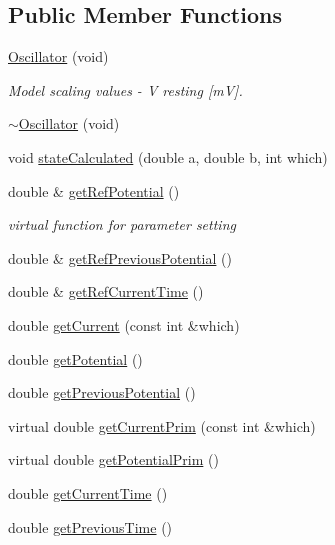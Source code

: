\subsection*{Public Member Functions}
\begin{DoxyCompactItemize}
\item 
\hyperlink{class_oscillator_aad43fa7eeffdeb0cbc4767f2de538d80}{Oscillator} (void)
\begin{DoxyCompactList}\small\item\em Model scaling values -\/ V resting \mbox{[}m\+V\mbox{]}. \end{DoxyCompactList}\item 
\hyperlink{class_oscillator_accb2f4ecc6604b2c38a7fd9973578360}{$\sim$\+Oscillator} (void)
\item 
void \hyperlink{class_oscillator_abc5d43aeb061d97dd58749baf2b8f82d}{state\+Calculated} (double a, double b, int which)
\item 
double \& \hyperlink{class_oscillator_a6d6d8ef3c022f6fd8c31c3e50987a822}{get\+Ref\+Potential} ()
\begin{DoxyCompactList}\small\item\em virtual function for parameter setting \end{DoxyCompactList}\item 
double \& \hyperlink{class_oscillator_a734d7375586e9982a6419d1f08b63c57}{get\+Ref\+Previous\+Potential} ()
\item 
double \& \hyperlink{class_oscillator_ac82b2732257e64c0f84f5b520ef16704}{get\+Ref\+Current\+Time} ()
\item 
double \hyperlink{class_oscillator_a2dcfd98ad9d0c6e03cc07f84dd5f054a}{get\+Current} (const int \&which)
\item 
double \hyperlink{class_oscillator_a6ababfb0cb31e5dbf26b4d60a0d0bb16}{get\+Potential} ()
\item 
double \hyperlink{class_oscillator_a6272096989cb47a1cf43fd3aee78fdf5}{get\+Previous\+Potential} ()
\item 
virtual double \hyperlink{class_oscillator_a6132c7be8737a5686d64629b68b81743}{get\+Current\+Prim} (const int \&which)
\item 
virtual double \hyperlink{class_oscillator_a932fda2705d851fbe28c569547f4b4f1}{get\+Potential\+Prim} ()
\item 
double \hyperlink{class_oscillator_a6e403f6aa9e2cd9ff8aea1aefdb9459c}{get\+Current\+Time} ()
\item 
double \hyperlink{class_oscillator_a0768ee28a72db7e13e14fb717408292c}{get\+Previous\+Time} ()

\end{DoxyCompactItemize}
